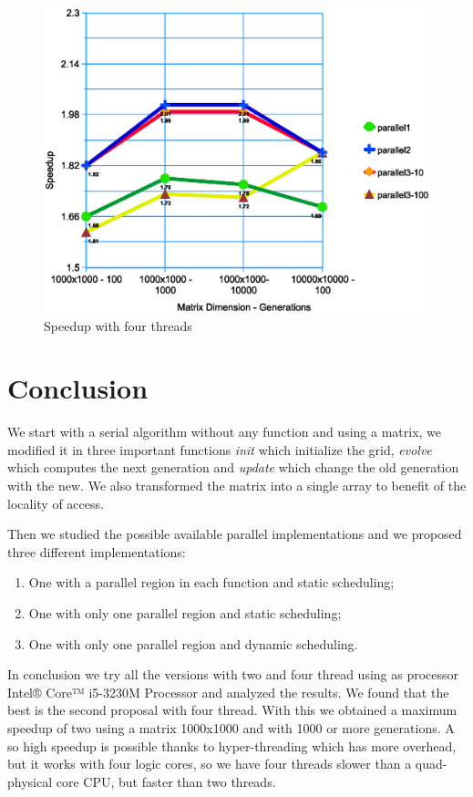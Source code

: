 \documentclass[a4paper,11pt,twoside]{report}
\begin{document}
\begin{center}
\begin{figure}
	\centering
	\includegraphics[scale = 0.5]{4.eps}
	\caption{Speedup with four threads} \label{fig:9}
\end{figure}
\end{center}

\chapter{Conclusion}
We start with a serial algorithm without any function and using a matrix, we modified it in three important functions \emph{init} which initialize the grid, \emph{evolve} which computes the next generation and \emph{update} which change the old generation with the new. We also transformed the matrix into a single array to benefit of the locality of access.

\noindent Then we studied the possible available parallel implementations and we proposed three different implementations:
\begin{enumerate}
\item One with a parallel region in each function and static scheduling;
 \item One with only one parallel region and static scheduling;
 \item One with only one parallel region and dynamic scheduling.
\end{enumerate}
In conclusion we try all the versions with two and four thread using as processor Intel® Core™ i5-3230M Processor and analyzed the results. We found that the best is the second proposal with four thread. With this we obtained a maximum speedup of two using a matrix 1000x1000 and with 1000 or more generations. A so high speedup is possible thanks to hyper-threading which has more overhead, but it works with four logic cores, so we have four threads slower than a quad-physical core CPU, but faster than two threads.
\end{document}
